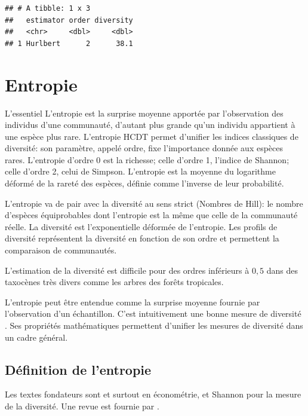 \documentclass[
  11pt,
  american,
  a4paper,
  extrafontsizes,onecolumn,openright
  ]{memoir}
\newenvironment{Summary}
  {\begin{bclogo}[logo=\bctrombone, noborder=true, couleur=lightgray!50]{L'essentiel}\parindent0pt}
  {\end{bclogo}}
\begin{document}
\begin{verbatim}
## # A tibble: 1 x 3
##   estimator order diversity
##   <chr>     <dbl>     <dbl>
## 1 Hurlbert      2      38.1
\end{verbatim}

\normalsize

\hypertarget{entropie}{%
\chapter{Entropie}\label{entropie}}

\begin{Summary}
L'entropie est la surprise moyenne apportée par l'observation des individus d'une communauté, d'autant plus grande qu'un individu appartient à une espèce plus rare.
L'entropie HCDT permet d'unifier les indices classiques de diversité: son paramètre, appelé ordre, fixe l'importance donnée aux espèces rares. L'entropie d'ordre 0 est la richesse; celle d'ordre 1, l'indice de Shannon; celle d'ordre 2, celui de Simpson.
L'entropie est la moyenne du logarithme déformé de la rareté des espèces, définie comme l'inverse de leur probabilité.

L'entropie va de pair avec la diversité au sens strict (Nombres de Hill): le nombre d'espèces équiprobables dont l'entropie est la même que celle de la communauté réelle.
La diversité est l'exponentielle déformée de l'entropie.
Les profils de diversité représentent la diversité en fonction de son ordre et permettent la comparaison de communautés.

L'estimation de la diversité est difficile pour des ordres inférieurs à \(0,5\) dans des taxocènes très divers comme les arbres des forêts tropicales.

\end{Summary}

L'entropie peut être entendue comme la surprise moyenne fournie par l'observation d'un échantillon.
C'est intuitivement une bonne mesure de diversité \autocite{Pielou1975}.
Ses propriétés mathématiques permettent d'unifier les mesures de diversité dans un cadre général.

\hypertarget{duxe9finition-de-lentropie}{%
\section{Définition de l'entropie}\label{duxe9finition-de-lentropie}}

Les textes fondateurs sont \textcite{Davis1941} et surtout \textcite{Theil1967} en économétrie, et Shannon \autocite*{Shannon1948,Shannon1963} pour la mesure de la diversité.
Une revue est fournie par \textcite{Maasoumi1993}.
\end{document}

